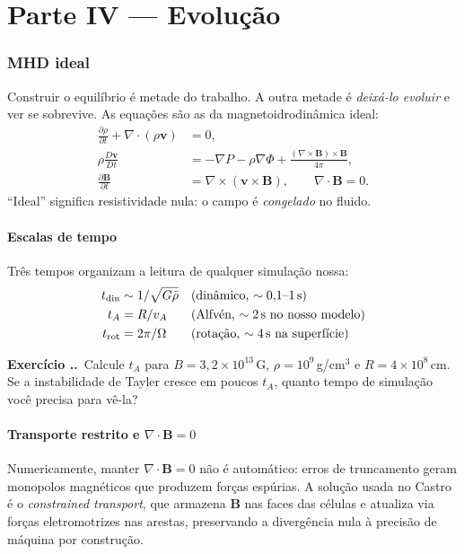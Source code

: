 \documentclass[11pt,a4paper]{article}
\newcounter{exerc}[section]
\newcommand{\ex}[1]{\refstepcounter{exerc}%
  \medskip\noindent\textbf{Exercício \thesection.\theexerc.}\ #1\medskip}
\begin{document}
\part*{Parte IV --- Evolução}

\section{MHD ideal}

Construir o equilíbrio é metade do trabalho. A outra metade é \emph{deixá-lo
evoluir} e ver se sobrevive. As equações são as da magnetoidrodinâmica ideal:
\begin{align}
\frac{\partial\rho}{\partial t} + \nabla\cdot(\rho\mathbf{v}) &= 0, \\
\rho\frac{D\mathbf{v}}{Dt} &= -\nabla P - \rho\nabla\Phi
  + \frac{(\nabla\times\mathbf{B})\times\mathbf{B}}{4\pi},\\
\frac{\partial\mathbf{B}}{\partial t} &= \nabla\times(\mathbf{v}\times\mathbf{B}),
\qquad \nabla\cdot\mathbf{B}=0 .
\end{align}
``Ideal'' significa resistividade nula: o campo é \emph{congelado} no fluido.

\subsection{Escalas de tempo}

Três tempos organizam a leitura de qualquer simulação nossa:
\begin{align}
t_{\rm din} &\sim 1/\sqrt{G\bar\rho} &&\text{(dinâmico, $\sim 0{,}1$--$1$\,s)}\\
t_A &= R/v_A &&\text{(Alfvén, $\sim 2$\,s no nosso modelo)}\\
t_{\rm rot} &= 2\pi/\Omega &&\text{(rotação, $\sim 4$\,s na superfície)}
\end{align}

\ex{Calcule $t_A$ para $B = 3{,}2\times10^{13}$\,G, $\rho = 10^9$\,g/cm$^3$ e
$R = 4\times10^8$\,cm. Se a instabilidade de Tayler cresce em poucos $t_A$,
quanto tempo de simulação você precisa para vê-la?}

\subsection{Transporte restrito e $\nabla\cdot\mathbf{B}=0$}

Numericamente, manter $\nabla\cdot\mathbf{B}=0$ não é automático: erros de
truncamento geram monopolos magnéticos que produzem forças espúrias. A solução
usada no Castro é o \emph{constrained transport}, que armazena $\mathbf{B}$ nas
faces das células e atualiza via forças eletromotrizes nas arestas, preservando
a divergência nula à precisão de máquina por construção.
\end{document}
